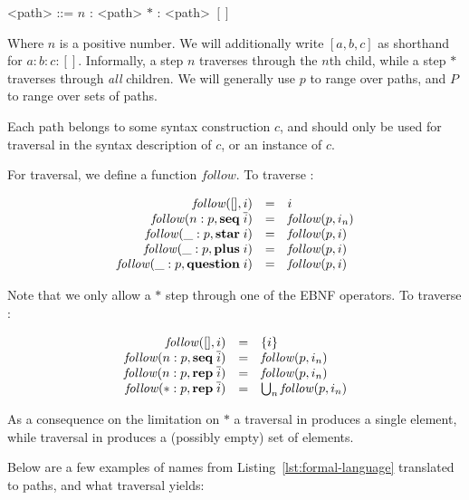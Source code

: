 \documentclass{kththesis}
\begin{document}
\setlength{\grammarindent}{5.5em}
\begin{grammar}
<path> ::= $n$ : <path>
\alt $*$ : <path>
\alt $[]$
\end{grammar}

Where $n$ is a positive number. We will additionally write $[a, b, c]$ as shorthand for $a : b : c : []$. Informally, a step $n$ traverses through the $n$th child, while a step $*$ traverses through \emph{all} children. We will generally use $p$ to range over paths, and $P$ to range over sets of paths.

Each path belongs to some syntax construction $c$, and should only be used for traversal in the syntax description of $c$, or an instance of $c$.

\newcommand{\follow}{\mathit{follow}}

For traversal, we define a function $\follow$. To traverse :

$$
\begin{array}{rcl}
\follow([], i) &=& i \\
\follow(n : p, \seq \overline{i}) &=& \follow(p, i_n) \\
\follow(\_ : p, \repstar i) &=& \follow(p, i) \\
\follow(\_ : p, \repplus i) &=& \follow(p, i) \\
\follow(\_ : p, \repquestion i) &=& \follow(p, i) \\
\end{array}
$$

Note that we only allow a $*$ step through one of the EBNF operators. To traverse :

$$
\begin{array}{rcl}
\follow([], i) &=& \{i\} \\
\follow(n : p, \seq \overline{i}) &=& \follow(p, i_n) \\
\follow(n : p, \repseq \overline{i}) &=& \follow(p, i_n) \\
\follow(* : p, \repseq \overline{i}) &=& \bigcup_n \follow(p, i_n) \\
\end{array}
$$

As a consequence on the limitation on $*$ a traversal in  produces a single element, while traversal in  produces a (possibly empty) set of elements.

Below are a few examples of names from Listing~\ref{lst:formal-language} translated to paths, and what traversal yields:
\end{document}
